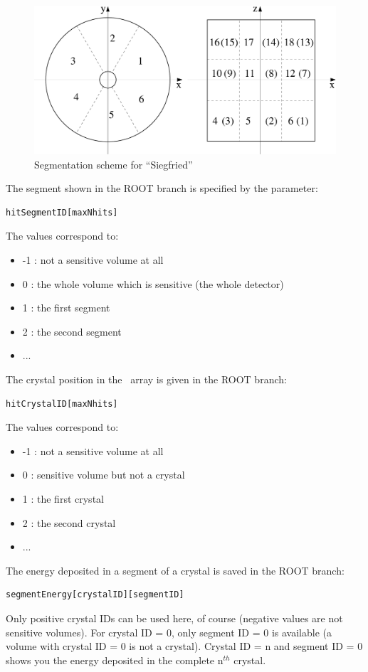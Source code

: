 \begin{figure}[h!]
 \includegraphics[scale=.3]{figures/segSchema}
\caption{Segmentation scheme for ``Siegfried''}
\end{figure} \label{fig:segscheme}
The segment shown in the ROOT branch is specified by the parameter:
\begin{lstlisting}
hitSegmentID[maxNhits]
\end{lstlisting}
The values correspond to:
\begin{itemize}
\item  -1 : not a sensitive volume at all
\item 0 : the whole volume which is sensitive (the whole detector)
\item 1 : the first segment  
\item 2 : the second segment
\item  ...
\end{itemize}
\vspace{0.2cm}
The crystal position in the \gerda \ array is given in the ROOT branch:
\begin{lstlisting}
hitCrystalID[maxNhits]
\end{lstlisting}
The values correspond to:
\begin{itemize}
\item -1 : not a sensitive volume at all
\item 0 : sensitive volume but not a crystal
\item 1 : the first crystal
\item 2 : the second crystal
\item  ...
\end{itemize}
The energy deposited in a segment of a crystal is saved in the ROOT branch:
\begin{lstlisting}
segmentEnergy[crystalID][segmentID]
\end{lstlisting}
Only positive crystal IDs can be used here, of course (negative values are not sensitive volumes). For crystal ID = 0, only segment ID = 0 is available (a volume with crystal ID = 0 is not a crystal). Crystal ID = n and segment ID = 0 shows you the energy deposited in the complete  n$^{th}$ crystal.\\
